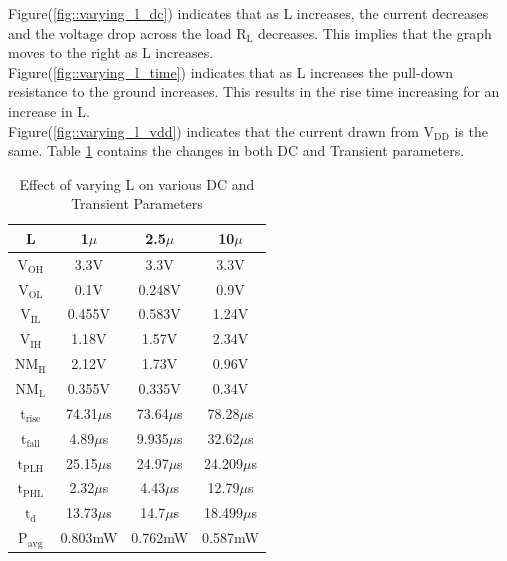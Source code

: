 \documentclass[12pt]{article}
\begin{document}
	
	Figure(\ref{fig::varying_l_dc}) indicates that as L increases, the current decreases and the voltage drop across the load $\text{R}_\text{L}$ decreases. This implies that the graph moves to the right as L increases.\\
    Figure(\ref{fig::varying_l_time}) indicates that as L increases the pull-down resistance to the ground increases. This results in the rise time increasing for an increase in L.\\
    Figure(\ref{fig::varying_l_vdd}) indicates that the current drawn from $\text{V}_{\text{DD}}$ is the same. Table \ref{table::tablevaryl} contains the changes in both DC and Transient parameters.
    \begin{table}[H]
    	\begin{center}
    		\begin{tabular}{|c|c|c|c|}
    			\hline 
    			\rule[-1ex]{0pt}{2.5ex} L & 1$\mu$ & 2.5$\mu$ & 10$\mu$  \\ 
    			\hline 
    			\rule[-1ex]{0pt}{2.5ex} $\text{V}_\text{OH}$ & 3.3V & 3.3V & 3.3V \\ 
    			 $\text{V}_\text{OL}$ & 0.1V & 0.248V & 0.9V \\ 
    			 $\text{V}_\text{IL}$ & 0.455V & 0.583V & 1.24V \\ 
    			 $\text{V}_\text{IH}$ & 1.18V & 1.57V & 2.34V \\ 
    			 $\text{NM}_\text{H}$ & 2.12V & 1.73V & 0.96V \\ 
    			 $\text{NM}_\text{L}$ & 0.355V & 0.335V & 0.34V \\ 
    			 $\text{t}_\text{rise}$ & 74.31$\mu$s & 73.64$\mu$s & 78.28$\mu$s \\ 
    			 $\text{t}_\text{fall}$ & 4.89$\mu$s & 9.935$\mu$s & 32.62$\mu$s \\ 
    			 $\text{t}_\text{PLH}$ & 25.15$\mu$s & 24.97$\mu$s & 24.209$\mu$s \\ 
    			 $\text{t}_\text{PHL}$ & 2.32$\mu$s & 4.43$\mu$s & 12.79$\mu$s \\ 
    			 $\text{t}_\text{d}$ & 13.73$\mu$s & 14.7$\mu$s & 18.499$\mu$s \\ 
    			 $\text{P}_\text{avg}$ & 0.803mW  & 0.762mW & 0.587mW \\ 
    			\hline 
    		\end{tabular} 
    	\end{center}
    	\caption{Effect of varying L on various DC and Transient Parameters}
    	\label{table::tablevaryl}
    \end{table}
\end{document}
